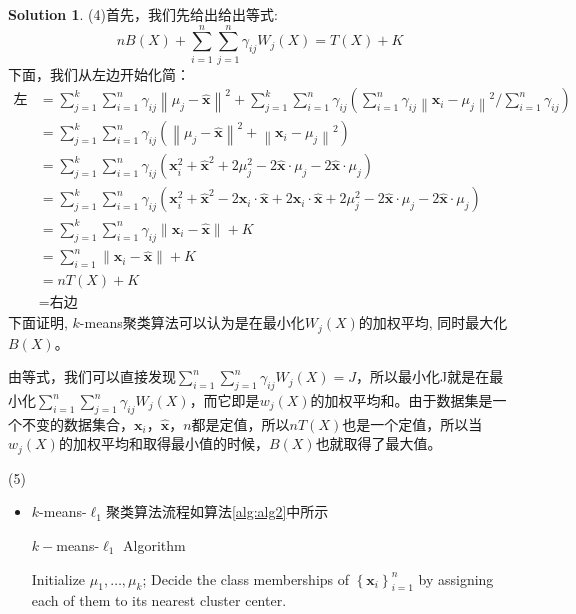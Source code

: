 \documentclass[a4paper,UTF8]{article}
\theoremstyle{definition}
\newtheorem*{solution}{Solution}
\begin{document}
\begin{solution}
(4)首先，我们先给出给出等式:$$nB(X)+\sum_{i=1}^n\sum_{j=1}^n\gamma_{ij}W_j(X)=T(X)+K$$
下面，我们从左边开始化简：
\begin{align*}
\text{左边}&=\sum_{j=1}^{k} \sum_{i=1}^{n} \gamma_{i j}\left\|\mu_{j}-\hat{\mathbf{x}}\right\|^{2} +\sum_{j=1}^{k} \sum_{i=1}^{n}\gamma_{i j}(\sum_{i=1}^{n} \gamma_{i j}\left\|\mathbf{x}_{i}-\mu_{j}\right\|^{2} / \sum_{i=1}^{n} \gamma_{i j})\\
&=\sum_{j=1}^{k} \sum_{i=1}^{n} \gamma_{i j}(\left\|\mu_{j}-\hat{\mathbf{x}}\right\|^{2}+\left\|\mathbf{x}_i-\mu_j\right\|^{2})\\
&=\sum_{j=1}^{k} \sum_{i=1}^{n} \gamma_{i j}(\mathbf{x}_i^2+\hat{\mathbf{x}}^2+2\mu_j^2-2\hat{\mathbf{x}}\cdot\mu_j-2\hat{\mathbf{x}}\cdot\mu_j)\\
&=\sum_{j=1}^{k} \sum_{i=1}^{n} \gamma_{i j}(\mathbf{x}_i^2+\hat{\mathbf{x}}^2-2\mathbf{x}_i\cdot\hat{\mathbf{x}}+2\mathbf{x}_i\cdot\hat{\mathbf{x}}+2\mu_j^2-2\hat{\mathbf{x}}\cdot\mu_j-2\hat{\mathbf{x}}\cdot\mu_j)\\
&=\sum_{j=1}^{k} \sum_{i=1}^{n} \gamma_{i j}\left\|\mathbf{x}_{i}-\hat{\mathbf{x}}\right\|+K\\
&= \sum_{i=1}^{n}\left\|\mathbf{x}_{i}-\hat{\mathbf{x}}\right\|+K\\
&=nT(X)+K\\
&=\text{右边}
\end{align*}
下面证明, $k$-means聚类算法可以认为是在最小化$W_j(X)$的加权平均, 同时最大化$B(X)$。

由等式，我们可以直接发现$\sum_{i=1}^n\sum_{j=1}^n\gamma_{ij}W_j(X)=J$，所以最小化J就是在最小化$\sum_{i=1}^n\sum_{j=1}^n\gamma_{ij}W_j(X)$，而它即是$w_j(X)$的加权平均和。由于数据集是一个不变的数据集合，$\mathbf{x}_{i}$，$\hat{\mathbf{x}}$，$n$都是定值，所以$nT(X)$也是一个定值，所以当$w_j(X)$的加权平均和取得最小值的时候，$B(X)$也就取得了最大值。

(5)
\begin{itemize}
	\item  $k$-means-$\ell _1$聚类算法流程如算法\ref{alg:alg2}中所示

{\begin{algorithm}[h]
		\caption{ $k-$means-$\ell _1$ Algorithm }
		\label{alg:alg2}
		\begin{algorithmic}[1]{
				\STATE Initialize $\mu_{1}, \ldots, \mu_{k}$;
				\REPEAT
				 Decide the class memberships of $\left\{\mathbf{x}_{i}\right\}_{i=1}^{n}$ by assigning each of them
				to its nearest cluster center.
				
}
\end{algorithmic}
\end{algorithm}}
\end{itemize}
\end{solution}
\end{document}
